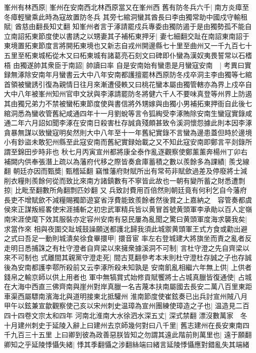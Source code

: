 峯州有林西原|{
	峯州在安南西北林西原當又在峯州西}
舊有防冬兵六千|{
	南方炎瘴至冬瘴輕蠻乘此時為寇故置防冬兵}
其旁七綰洞蠻其酋長曰李由獨常助中國戍守輸租賦|{
	酋慈由翻長知丈翻}
知峯州者言于涿請罷戍兵專委由獨防遏于是由獨勢孤不能自立南詔拓東節度使以書誘之以甥妻其子補柘東押牙|{
	妻七細翻交趾在南詔東南詔于東境置拓東節度言將開拓東境也又新志自戎州開邊縣七十里至曲州又一千九百七十五里至柘東城柘從木又曰柘東城有諸葛亮石刻文曰碑即仆蠻為漢奴夷畏誓常以石榰梧}
由獨遂帥其衆臣于南詔|{
	帥讀曰率}
自是安南始有蠻患是月蠻寇安南　|{
	考異曰實録無涿除安南年月蠻書云大中八年安南都護擅罷林西原防冬戍卒洞主李由獨等七綰首領被蠻誘引復為親情日往月來漸遭侵軼又曰桃花蠻本屬由獨管轄亦為界上戍卒自大中八年被峯州知州官申文狀與李涿請罷防冬將健六千人不要味真登等州界上防遏其由獨兄弟力不禁被蠻柘東節度使與書信將外甥嫁與由獨小男補拓東押衙自此後七綰洞悉為蠻收管舊紀咸通四年十一月劉蛻等言令狐綯受李涿賄除安南生蠻寇實錄咸通二年六月詔如聞李涿在安南日殺害杜存誠貪殘頗甚致令溪洞懷怨據此則本因李涿貪暴無謀以致蠻寇明矣然則大中八年至十一年舊紀實錄不言蠻為邊患蓋但時於邊境小有鈔盜未敢犯州縣至此寇安南而舊紀實録始載之又不知此寇安南即鄭言平剡錄所謂至錦田步時非也}
秋七月丙寅宣州都將康全泰作亂逐觀察使鄭薰薰奔楊州丁卯右補闕内供奉張潛上疏以為藩府代移之際皆奏倉庫蓄積之數以羨餘多為課績|{
	羨戈線翻}
朝廷亦因而甄奬|{
	甄稽延翻}
竊惟藩府財賦所出有常苟非賦歛過差及停廢將士減削衣糧則羨餘何從而致比來南方諸鎮數有不寧皆此故也一朝有變所蓄之財悉遭剽掠|{
	比毗至翻數所角翻剽匹妙翻}
又兵致討費用百倍然則朝廷竟有何利乞自今藩府長吏不增賦歛不減糧賜獨節遊宴省浮費能致羨餘者然後賞之上嘉納之　容管奏都虞侯來正謀叛經畧使宋涯捕斬之初忠武軍精兵皆以黄冒首號黄頭軍李承勛以百人定嶺南宋涯使麾下效其服裝亦定容州安南有惡民屢為亂聞之驚曰黄頭軍度海求襲我矣|{
	求當作來}
相與夜圍交趾城鼓譟願送都護北歸我須此城禦黄頭軍王式方食或勸出避之式曰吾足一動則城潰矣徐食畢擐甲|{
	擐音宦}
率左右登城建大將旗坐而責之亂者反走明日悉捕誅之有杜守澄者自齊梁以來擁衆據溪洞不可制|{
	言杜守澄之先自齊梁以來不可制也}
式離間其親黨守澄走死|{
	間古莧翻參考本末則杜守澄杜存誠之子也存誠後為安南都護李鄠所殺前又云李涿所殺未知孰是}
安南飢亂相繼六年無上供|{
	上供者錢帛之輸京師以供上用者也}
軍中無犒賞式始修貢賦饗將士占城真臘皆復通使|{
	占城在大海中西直三佛齊南與崖州對岸真臘一名吉蔑本扶南屬國去長安二萬八百里東距車渠西屬驃南濱海北與道明接東北抵驩州}
淮南節度使崔鉉奏已出兵討宣州賊八月甲午以鉉兼宣歙觀察使己亥以宋州刺史温璋為宣州團練使璋造之子也|{
	温造見二百四十四卷文宗太和四年}
河南北淮南大水徐泗水深五丈|{
	深式禁翻}
漂沒數萬家　冬十月建州刺史于延陵入辭上曰建州去京師幾何對曰八千里|{
	舊志建州在長安東南四千九百三十五里}
上曰卿到彼為政善惡朕皆知之勿謂其遠此階前則萬里也|{
	遠于願翻}
卿知之乎延陵悸懾失緒|{
	悸其季翻懾之涉翻絲端曰緒言延陵悸懾應對錯亂失其端緒}
